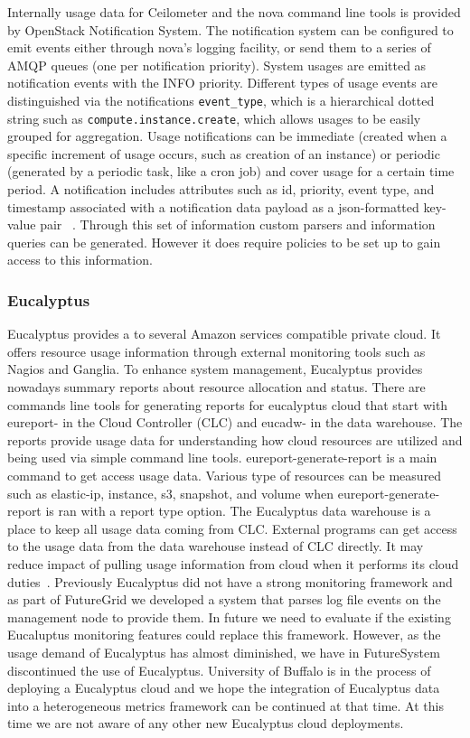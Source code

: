 \documentclass{sig-alternate-05-2015}
\begin{document}
Internally usage data for Ceilometer and the nova command line tools
is provided by OpenStack Notification System. The notification system
can be configured to emit events either through nova's logging
facility, or send them to a series of AMQP queues (one per
notification priority). System usages are emitted as notification
events with the INFO priority. Different types of usage events are
distinguished via the notifications \verb|event_type|, which is a
hierarchical dotted string such as \verb|compute.instance.create|,
which allows usages to be easily grouped for aggregation. Usage
notifications can be immediate (created when a specific increment of
usage occurs, such as creation of an instance) or periodic (generated
by a periodic task, like a cron job) and cover usage for a certain
time period. A notification includes attributes such as id, priority,
event type, and timestamp associated with a notification data payload
as a json-formatted key-value pair ~\cite{SystemUsageData}.  Through
this set of information custom parsers and information queries can be
generated. However it does require policies to be set up to gain
access to this information.

\subsubsection{Eucalyptus}

Eucalyptus provides a to several Amazon services compatible private
cloud.  It offers resource usage information through external
monitoring tools such as Nagios and Ganglia.  To enhance system
management, Eucalyptus provides nowadays summary reports about
resource allocation and status. There are commands line tools for
generating reports for eucalyptus cloud that start with eureport- in
the Cloud Controller (CLC) and eucadw- in the data warehouse. The
reports provide usage data for understanding how cloud resources are
utilized and being used via simple command line
tools. eureport-generate-report is a main command to get access usage
data. Various type of resources can be measured such as elastic-ip,
instance, s3, snapshot, and volume when eureport-generate-report is
ran with a report type option. The Eucalyptus data warehouse is a
place to keep all usage data coming from CLC. External programs can
get access to the usage data from the data warehouse instead of CLC
directly. It may reduce impact of pulling usage information from cloud
when it performs its cloud duties~\cite{Euca2ools14}.
Previously Eucalyptus did not have a strong monitoring framework and
as part of FutureGrid we developed a system that parses log file
events on the management node to provide them. In future we need to
evaluate if the existing Eucaluptus monitoring features could replace
this framework. However, as the usage demand of Eucalyptus has almost
diminished, we have in FutureSystem discontinued the use of
Eucalyptus. University of Buffalo is in the process of deploying a
Eucalyptus cloud and we hope the integration of Eucalyptus data into a
heterogeneous metrics framework can be continued at that time. At this
time we are not aware of any other new Eucalyptus cloud deployments.
\end{document}
